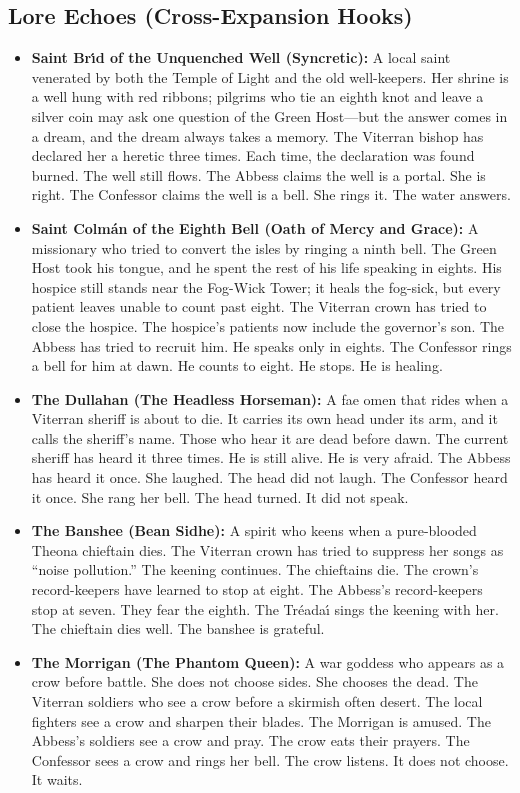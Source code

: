 \subsection*{Lore Echoes (Cross-Expansion Hooks)}
\begin{itemize}
  \item \textbf{Saint Br\'{\i}d of the Unquenched Well (Syncretic):} A local saint venerated by both the Temple of Light and the old well-keepers. Her shrine is a well hung with red ribbons; pilgrims who tie an eighth knot and leave a silver coin may ask one question of the Green Host---but the answer comes in a dream, and the dream always takes a memory. The Viterran bishop has declared her a heretic three times. Each time, the declaration was found burned. The well still flows. The Abbess claims the well is a portal. She is right. The Confessor claims the well is a bell. She rings it. The water answers.
  \item \textbf{Saint Colm\'{a}n of the Eighth Bell (Oath of Mercy and Grace):} A missionary who tried to convert the isles by ringing a ninth bell. The Green Host took his tongue, and he spent the rest of his life speaking in eights. His hospice still stands near the Fog-Wick Tower; it heals the fog-sick, but every patient leaves unable to count past eight. The Viterran crown has tried to close the hospice. The hospice's patients now include the governor's son. The Abbess has tried to recruit him. He speaks only in eights. The Confessor rings a bell for him at dawn. He counts to eight. He stops. He is healing.
  \item \textbf{The Dullahan (The Headless Horseman):} A fae omen that rides when a Viterran sheriff is about to die. It carries its own head under its arm, and it calls the sheriff's name. Those who hear it are dead before dawn. The current sheriff has heard it three times. He is still alive. He is very afraid. The Abbess has heard it once. She laughed. The head did not laugh. The Confessor heard it once. She rang her bell. The head turned. It did not speak.
  \item \textbf{The Banshee (Bean Sidhe):} A spirit who keens when a pure-blooded Theona chieftain dies. The Viterran crown has tried to suppress her songs as ``noise pollution.'' The keening continues. The chieftains die. The crown's record-keepers have learned to stop at eight. The Abbess's record-keepers stop at seven. They fear the eighth. The Tr\'eada\'{\i} sings the keening with her. The chieftain dies well. The banshee is grateful.
  \item \textbf{The Morrigan (The Phantom Queen):} A war goddess who appears as a crow before battle. She does not choose sides. She chooses the dead. The Viterran soldiers who see a crow before a skirmish often desert. The local fighters see a crow and sharpen their blades. The Morrigan is amused. The Abbess's soldiers see a crow and pray. The crow eats their prayers. The Confessor sees a crow and rings her bell. The crow listens. It does not choose. It waits.

\end{itemize}
